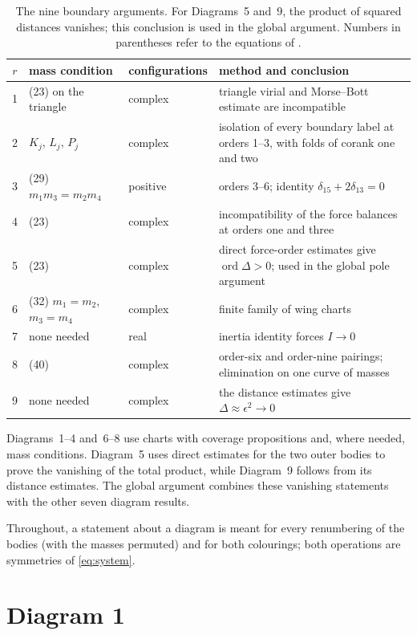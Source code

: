 \documentclass[11pt]{amsart}
\theoremstyle{definition}
\theoremstyle{remark}
\newcommand{\ord}{\operatorname{ord}}
\begin{document}
{\begin{table}[ht]
\centering
\small
\begin{tabular}{cllp{5.4cm}}
\hline
$r$ & mass condition & configurations & method and conclusion \\
\hline
1 & (23) on the triangle & complex & triangle virial and Morse--Bott estimate are incompatible \\
2 & $K_j$, $L_j$, $P_j$ & complex & isolation of every boundary label at orders 1--3,
with folds of corank one and two \\
3 & (29) $m_1m_3=m_2m_4$ & positive & orders 3--6; identity $\delta_{15}+2\delta_{13}=0$ \\
4 & (23) & complex & incompatibility of the force balances at orders one and three \\
5 & (23) & complex & direct force-order estimates give $\ord\Delta>0$; used in the global pole argument \\
6 & (32) $m_1=m_2$, $m_3=m_4$ & complex & finite family of wing charts \\
7 & none needed & real & inertia identity forces $I\to0$ \\
8 & (40) & complex & order-six and order-nine pairings; elimination on one curve of masses \\
9 & none needed & complex & the distance estimates give $\Delta\approx\epsilon^2\to0$ \\
\hline
\end{tabular}
\caption{The nine boundary arguments.  For Diagrams~5 and~9, the product of squared distances vanishes;
this conclusion is used in the global argument.  Numbers in parentheses refer to the equations of \cite[\S8]{AK}.}
\label{tab:exclusions}
\end{table}

Diagrams~1--4 and~6--8 use charts with coverage propositions and, where needed, mass conditions.
Diagram~5 uses direct estimates for the two outer bodies to prove the vanishing of the total
product, while Diagram~9 follows from its distance estimates.  The global argument combines
these vanishing statements with the other seven diagram results.
}
Throughout, a statement about a diagram is meant for every renumbering of the bodies (with the
masses permuted) and for both colourings; both operations are symmetries of
\eqref{eq:system}.


\section{Diagram 1}\label{sec:d1}
\end{document}
